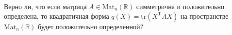 \documentclass{article}
\begin{document}
Верно ли, что если матрица $A \in \mathrm{Mat}_n (\mathbb{R})$ симметрична
и положительно определена, то квадратичная форма $q(X) = \mathrm{tr}(X^\mathrm{T} A X)$ на пространстве $\mathrm{Mat}_n (\mathbb{R})$ будет положительно определенной?
\end{document}
